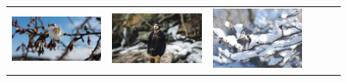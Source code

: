 \begin{figure}
\begin{minipage}[t]{\textwidth}
\begin{tabular}{m{.01\linewidth} m{.16\linewidth} m{.16\linewidth} m{.16\linewidth} m{.16\linewidth} m{.16\linewidth}}
    \includegraphics[width=\linewidth]{../style/figures/flickr_on_flickr/pred_style_Depth_of_Field/1.jpg} &
    \includegraphics[width=\linewidth]{../style/figures/flickr_on_flickr/pred_style_Depth_of_Field/2.jpg} &
    \includegraphics[width=\linewidth]{../style/figures/flickr_on_flickr/pred_style_Depth_of_Field/3.jpg} &

\end{tabular}
\end{minipage}
\end{figure}
